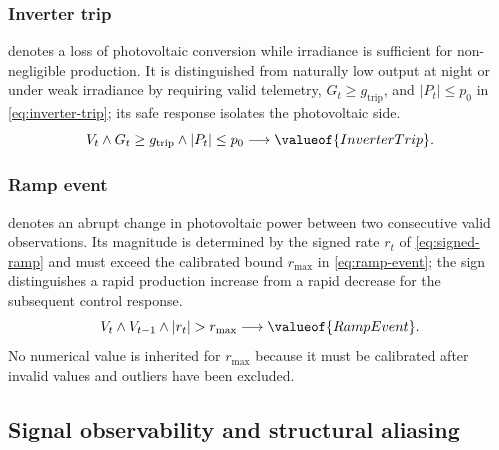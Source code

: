 \subsubsection{Inverter trip}

 denotes a loss of photovoltaic conversion while irradiance is sufficient for non-negligible production. It is distinguished from naturally low output at night or under weak irradiance by requiring valid telemetry, $G_t\geq g_{\mathrm{trip}}$, and $|P_t|\leq p_0$ in \autoref{eq:inverter-trip}; its safe response isolates the photovoltaic side.
\begin{equation}
V_t\wedge G_t\geq g_{\mathrm{trip}}\wedge |P_t|\leq p_0
\longrightarrow \valueof{InverterTrip}.
\label{eq:inverter-trip}
\end{equation}

\subsubsection{Ramp event}

 denotes an abrupt change in photovoltaic power between two consecutive valid observations. Its magnitude is determined by the signed rate $r_t$ of \autoref{eq:signed-ramp} and must exceed the calibrated bound $r_{\max}$ in \autoref{eq:ramp-event}; the sign distinguishes a rapid production increase from a rapid decrease for the subsequent control response.
\begin{equation}
V_t\wedge V_{t-1}\wedge |r_t|>r_{\max}
\longrightarrow \valueof{RampEvent}.
\label{eq:ramp-event}
\end{equation}
No numerical value is inherited for $r_{\max}$ because it must be calibrated after invalid values and outliers have been excluded.

\subsection{Signal observability and structural aliasing}

